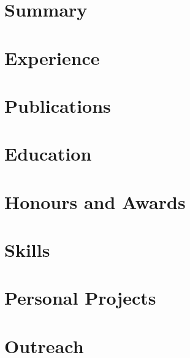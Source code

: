 \documentclass[english,a4paper,10pt]{extarticle}
\begin{document}
\pagestyle{only_footer}
\thispagestyle{header_footer}

\section{Summary}


\section{Experience}


\newpage
\section{Publications}


\section{Education}


\section{Honours and Awards}


\section{Skills}


\newpage
\section{Personal Projects}


\section{Outreach}


\end{document}
